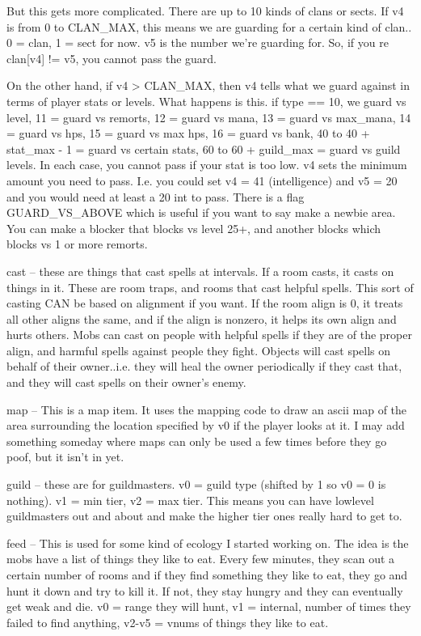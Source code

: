 But this gets more complicated. There are up to 10 kinds of clans or
sects. If v4 is from 0 to CLAN\_MAX, this means we are guarding for a
certain kind of clan.. 0 = clan, 1 = sect for now. v5 is the number
we're guarding for. So, if you re clan[v4] != v5, you cannot pass the
guard.

On the other hand, if v4 > CLAN\_MAX, then v4 tells what we guard
against in terms of player stats or levels. What happens is this. if
type == 10, we guard vs level, 11 = guard vs remorts, 12 = guard vs
mana, 13 = guard vs max\_mana, 14 = guard vs hps, 15 = guard vs max
hps, 16 = guard vs bank, 40 to 40 + stat\_max - 1 = guard vs certain
stats, 60 to 60 + guild\_max = guard vs guild levels. In each case,
you cannot pass if your stat is too low. v4 sets the minimum amount
you need to pass. I.e. you could set v4 = 41 (intelligence) and v5 =
20 and you would need at least a 20 int to pass. There is a flag
GUARD\_VS\_ABOVE which is useful if you want to say make a newbie
area. You can make a blocker that blocks vs level 25+, and another
blocks which blocks vs 1 or more remorts.

\bul cast -- these are things that cast spells at intervals. If a room
casts, it casts on things in it. These are room traps, and rooms that
cast helpful spells. This sort of casting CAN be based on alignment if
you want. If the room align is 0, it treats all other aligns the same,
and if the align is nonzero, it helps its own align and hurts
others. Mobs can cast on people with helpful spells if they are of the
proper align, and harmful spells against people they fight. Objects
will cast spells on behalf of their owner..i.e. they will heal the
owner periodically if they cast that, and they will cast spells on
their owner's enemy.


\bul map -- This is a map item. It uses the mapping code to draw an ascii map of the area surrounding the location specified by v0 if the player looks at it.
I may add something someday where maps can only be used a few times
before they go poof, but it isn't in yet.

\bul guild -- these are for guildmasters. v0 = guild type (shifted by
1 so v0 = 0 is nothing). v1 = min tier, v2 = max tier. This means you
can have lowlevel guildmasters out and about and make the higher tier
ones really hard to get to.

\bul feed -- This is used for some kind of ecology I started working
on. The idea is the mobs have a list of things they like to eat. Every
few minutes, they scan out a certain number of rooms and if they find
something they like to eat, they go and hunt it down and try to kill
it. If not, they stay hungry and they can eventually get weak and
die. v0 = range they will hunt, v1 = internal, number of times they
failed to find anything, v2-v5 = vnums of things they like to eat.

